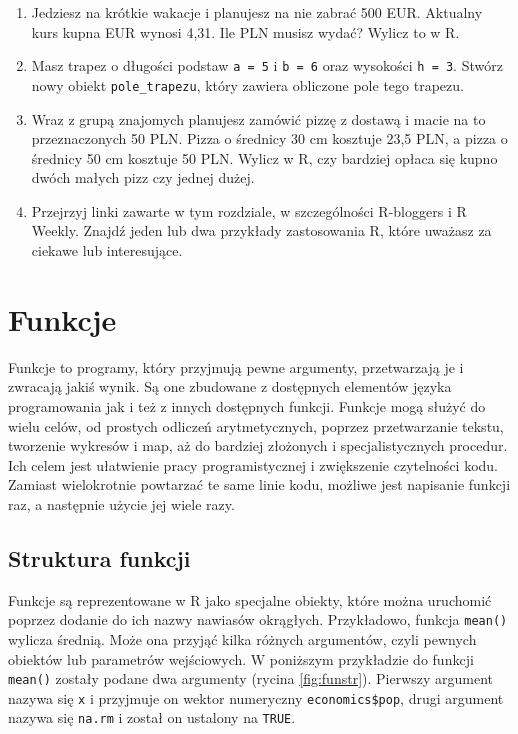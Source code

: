 \documentclass[paper=6in:9in,pagesize=pdftex,headinclude=on,footinclude=on,10pt]{scrbook}
\begin{document}
\begin{enumerate}
\def\labelenumi{\arabic{enumi})}
\setcounter{enumi}{1}
\item
  Jedziesz na krótkie wakacje i planujesz na nie zabrać 500 EUR.
  Aktualny kurs kupna EUR wynosi 4,31.
  Ile PLN musisz wydać?
  Wylicz to w R.
\item
  Masz trapez o długości podstaw \texttt{a\ =\ 5} i \texttt{b\ =\ 6} oraz wysokości \texttt{h\ =\ 3}.
  Stwórz nowy obiekt \texttt{pole\_trapezu}, który zawiera obliczone pole tego trapezu.
\item
  Wraz z grupą znajomych planujesz zamówić pizzę z dostawą i macie na to przeznaczonych 50 PLN.
  Pizza o średnicy 30 cm kosztuje 23,5 PLN, a pizza o średnicy 50 cm kosztuje 50 PLN.
  Wylicz w R, czy bardziej opłaca się kupno dwóch małych pizz czy jednej dużej.
\item
  Przejrzyj linki zawarte w tym rozdziale, w szczególności R-bloggers i R Weekly.
  Znajdź jeden lub dwa przykłady zastosowania R, które uważasz za ciekawe lub interesujące.
\end{enumerate}

\hypertarget{funkcje}{%
\chapter{Funkcje}\label{funkcje}}

Funkcje to programy, który przyjmują pewne argumenty, przetwarzają je i zwracają jakiś wynik.
Są one zbudowane z dostępnych elementów języka programowania jak i też z innych dostępnych funkcji.
Funkcje mogą służyć do wielu celów, od prostych odliczeń arytmetycznych, poprzez przetwarzanie tekstu, tworzenie wykresów i map, aż do bardziej złożonych i specjalistycznych procedur.
Ich celem jest ułatwienie pracy programistycznej i zwiększenie czytelności kodu.
Zamiast wielokrotnie powtarzać te same linie kodu, możliwe jest napisanie funkcji raz, a następnie użycie jej wiele razy.

\hypertarget{struktura-funkcji}{%
\section{Struktura funkcji}\label{struktura-funkcji}}

Funkcje są reprezentowane w R jako specjalne obiekty, które można uruchomić poprzez dodanie do ich nazwy nawiasów okrągłych.
Przykładowo, funkcja \texttt{mean()} wylicza średnią.
Może ona przyjąć kilka różnych argumentów, czyli pewnych obiektów lub parametrów wejściowych.
W poniższym przykładzie do funkcji \texttt{mean()} zostały podane dwa argumenty (rycina \ref{fig:funstr}).
Pierwszy argument nazywa się \texttt{x} i przyjmuje on wektor numeryczny \texttt{economics\$pop}, drugi argument nazywa się \texttt{na.rm} i został on ustalony na \texttt{TRUE}.
\end{document}
